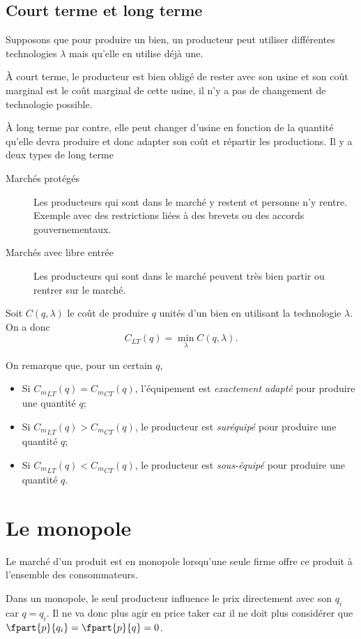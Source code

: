 \subsection{Court terme et long terme}
Supposons que pour produire un bien, un producteur peut utiliser
différentes technologies $\lambda$ mais qu'elle en utilise déjà une.

À court terme, le producteur est bien obligé de rester avec son usine
et son coût marginal est le coût marginal de cette usine, il n'y a pas
de changement de technologie possible.

À long terme par contre, elle peut changer d'usine en fonction de la quantité
qu'elle devra produire et donc adapter son coût et répartir les productions.
Il y a deux types de long terme
\begin{description}
  \item[Marchés protégés]
    Les producteurs qui sont dans le marché y restent et personne n'y rentre.
    Exemple avec des restrictions liées à des brevets ou des accords gouvernementaux.
  \item[Marchés avec libre entrée]
    Les producteurs qui sont dans le marché peuvent très bien partir ou rentrer sur le marché.
\end{description}

Soit $C(q,\lambda)$ le coût de produire $q$ unités d'un bien en utilisant
la technologie $\lambda$.
On a donc
\[ C_{LT}(q) = \min_\lambda C(q,\lambda). \]

On remarque que, pour un certain $q$,
\begin{itemize}
  \item Si ${C_m}_{LT}(q) = {C_m}_{CT}(q)$,
    l'équipement est \emph{exactement adapté} pour produire une quantité $q$;
  \item Si ${C_m}_{LT}(q) > {C_m}_{CT}(q)$,
    le producteur est \emph{suréquipé} pour produire une quantité $q$;
  \item Si ${C_m}_{LT}(q) < {C_m}_{CT}(q)$,
    le producteur est \emph{sous-équipé} pour produire une quantité $q$.
\end{itemize}

\section{Le monopole}
Le marché d'un produit est en monopole lorsqu'une seule firme
offre ce produit à l'ensemble des consommateurs.

Dans un monopole,
le seul producteur influence le prix directement avec son $q_i$ car $q = q_i$.
Il ne va donc plus agir en price taker car il ne doit plus
considérer que $\fpart{p}{q_i} = \fpart{p}{q} = 0$.

